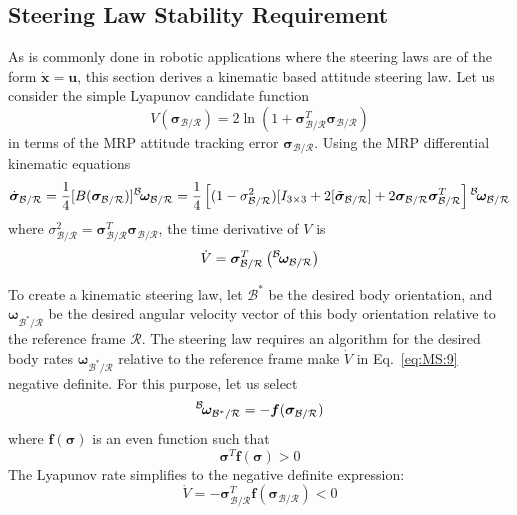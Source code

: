 \documentclass[]{BasiliskReportMemo}
\begin{document}
\subsection{Steering Law Stability Requirement}
As is commonly done in robotic applications where the steering laws are of the form $\dot{\bm x} = \bm u$, this section derives a kinematic based attitude steering law.  Let us consider the simple Lyapunov candidate function\cite{Tsiotras:1994lr,schaub}
\begin{equation}
	\label{eq:MS:7}
	V ( \bm\sigma_{\mathcal{B}/\mathcal{R}} ) = 2 \ln \left ( 1 + \bm\sigma_{\mathcal{B}/\mathcal{R}} ^{T} \bm\sigma_{\mathcal{B}/\mathcal{R}} \right)
\end{equation}
in terms of the MRP attitude tracking error $\bm\sigma_{\mathcal{B}/\mathcal{R}}$.  Using the MRP differential kinematic equations
\begin{equation}
	\label{eq:MS:8}
	\dot{\bm\sigma}_{\mathcal{B}/\mathcal{R}} = \frac{1}{4}[B(\bm\sigma_{\mathcal{B}/\mathcal{R}})] \leftexp{B}{\bm\omega}_{\mathcal{B}/\mathcal{R}}
	= \frac{1}{4} \left[
	(1-\sigma_{\mathcal{B}/\mathcal{R}}^{2})[I_{3\times 3} + 2 [\tilde{\bm\sigma}_{\mathcal{B}/\mathcal{R}}] + 2 \bm\sigma_{\mathcal{B}/\mathcal{R}} \bm\sigma_{\mathcal{B}/\mathcal{R}}^{T}
	\right] \leftexp{B}{\bm\omega}_{\mathcal{B}/\mathcal{R}}
\end{equation}
where $\sigma_{\mathcal{B}/\mathcal{R}}^{2} = \bm\sigma_{\mathcal{B}/\mathcal{R}}^{T} \bm\sigma_{\mathcal{B}/\mathcal{R}}$, the time derivative of $V$ is
\begin{equation}
	\label{eq:MS:9}
	\dot V =\bm \sigma_{\mathcal{B}/\mathcal{R}}^{T} \left(  \leftexp{B}{ \bm\omega}_{\mathcal{B}/\mathcal{R}}  \right)
\end{equation}

To create a kinematic steering law, let ${\mathcal{B}}^{\ast}$ be the desired body orientation, and $\bm\omega_{{\mathcal{B}}^{\ast}/\mathcal{R}}$ be the desired angular velocity vector of this body orientation relative to the reference frame $\mathcal{R}$.  The steering law requires an algorithm for the desired body rates $\bm\omega_{{\mathcal{B}}^{\ast}/\mathcal{R}}$  relative to the reference frame make $\dot V$ in Eq.~\eqref{eq:MS:9} negative definite.  For this purpose, let us select
\begin{equation}
	\label{eq:MS:10}
	\leftexp{B}{\bm\omega}_{{\mathcal{B}}^{\ast}/\mathcal{R}} = - \bm f(\bm\sigma_{\mathcal{B}/\mathcal{R}})
\end{equation}
where $\bm f(\bm\sigma)$ is an even function such that 
\begin{equation}
	\label{eq:MS:11}
	\bm \sigma ^{T} \bm f(\bm \sigma) > 0
\end{equation}
The Lyapunov rate simplifies to the negative definite expression:
\begin{equation}
	\label{eq:MS:12}
	\dot V = -  \bm \sigma_{\mathcal{B}/\mathcal{R}}^{T} \bm f(\bm \sigma_{\mathcal{B}/\mathcal{R}}) < 0
\end{equation}
\end{document}
